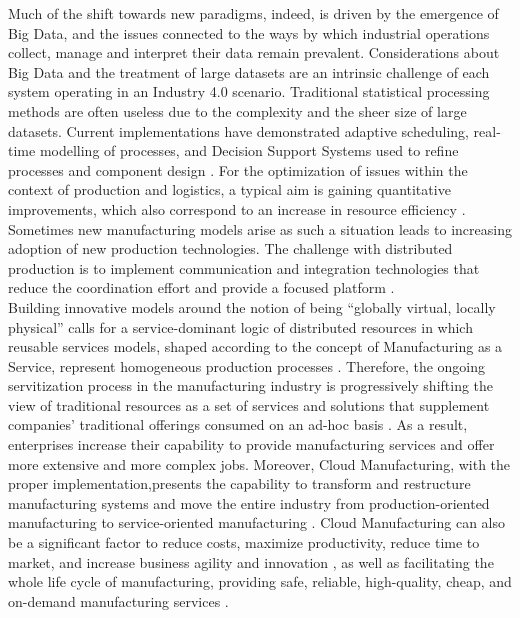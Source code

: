 Much of the shift towards new paradigms, indeed, is driven by the emergence of Big Data, and the issues connected to the ways by which industrial operations collect, manage and interpret their data remain prevalent\parencite{chen_data_2015}. Considerations about Big Data and the treatment of large datasets are an intrinsic challenge of each system operating in an Industry 4.0 scenario. Traditional statistical processing methods are often useless due to the complexity and the sheer size of large datasets. Current implementations have demonstrated adaptive scheduling, real-time modelling of processes, and Decision Support Systems used to refine processes and component design \parencite{oliff_towards_2017}. For the optimization of issues within the context of production and logistics, a typical aim is gaining quantitative improvements, which also correspond to an increase in resource efficiency \parencite{hauder_optimization_2017}. Sometimes new manufacturing models arise as such a situation leads to increasing adoption of new production technologies. The challenge with distributed production is to implement communication and integration technologies that reduce the coordination effort and provide a focused platform \parencite{khajavi_additive_2014}.\\
Building innovative models around the notion of being “globally virtual, locally physical” calls for a service-dominant logic of distributed resources in which reusable services models, shaped according to the concept of Manufacturing as a Service, represent homogeneous production processes \parencite{kayabay_wip_2018}. Therefore, the ongoing servitization process in the manufacturing industry is progressively shifting the view of traditional resources as a set of services and solutions that supplement companies’ traditional offerings consumed on an ad-hoc basis \parencite{bo-hu_cloud_2010}. As a result, enterprises increase their capability to provide manufacturing services and offer more extensive and more complex jobs. Moreover, Cloud Manufacturing, with the proper implementation,presents the capability to transform and restructure manufacturing systems and move the entire industry from production-oriented manufacturing to service-oriented manufacturing \parencite{xu_cloud_2012}. Cloud Manufacturing can also be a significant factor to reduce costs, maximize productivity, reduce time to market, and increase business agility and innovation \parencite{ren_cloud_2017}, as well as facilitating the whole life cycle of manufacturing, providing safe, reliable, high-quality, cheap, and on-demand manufacturing services \parencite{zhang_cloud_2014}.\\
